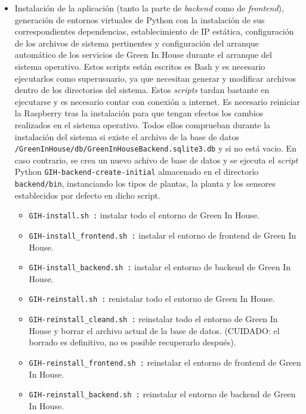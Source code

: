         \begin{itemize}    
            \item Instalación de la aplicación (tanto la parte de \textit{backend} como de \textit{frontend}), generación de entornos virtuales de Python con la instalación de sus correspondientes dependencias, establecimiento de IP estática, configuración de los archivos de sistema pertinentes y configuración del arranque automático de los servicios de Green In House durante el arranque del sistema operativo. Estos scripts están escritos es Bash y es necesario ejecutarlos como superusuario, ya que necesitan generar y modificar archivos dentro de los directorios del sistema. Estos \textit{scripts} tardan bastante en ejecutarse y es necesario contar con conexión a internet. Es necesario reiniciar la Raspberry tras la instalación para que tengan efectos los cambios realizados en el sistema operativo. Todos ellos comprueban durante la instalación del sistema si existe el archivo de la base de datos \texttt{/GreenInHouse/db/GreenInHouseBackend.sqlite3.db} y si no está vacio. En caso contrario, se crea un nuevo achivo de base de datos y se ejecuta el \textit{script} Python \texttt{GIH-backend-create-initial} almacenado en el directorio \texttt{backend/bin}, instanciando los tipos de plantas, la planta y los sensores establecidos por defecto en dicho script.
            \begin{itemize}
                \item \texttt{GIH-install.sh :} instalar todo el entorno de Green In House. 
                \item \texttt{GIH-install\_frontend.sh :} instalar el entorno de frontend de Green In House.
                \item \texttt{GIH-install\_backend.sh :} instalar el entorno de backend de Green In House.
                \item \texttt{GIH-reinstall.sh :} renistalar todo el entorno de Green In House.
                \item \texttt{GIH-reinstall\_cleand.sh :} reinstalar todo el entorno de Green In House y borrar el archivo actual de la base de datos. 
                \color{red}(CUIDADO: el borrado es definitivo, no es posible recuperarlo después). \color{black}
                \item \texttt{GIH-reinstall\_frontend.sh :} reinstalar el entorno de frontend de Green In House.
                \item \texttt{GIH-reinstall\_backend.sh :} reinstalar el entorno de backend de Green In House.

\end{itemize}
\end{itemize}
